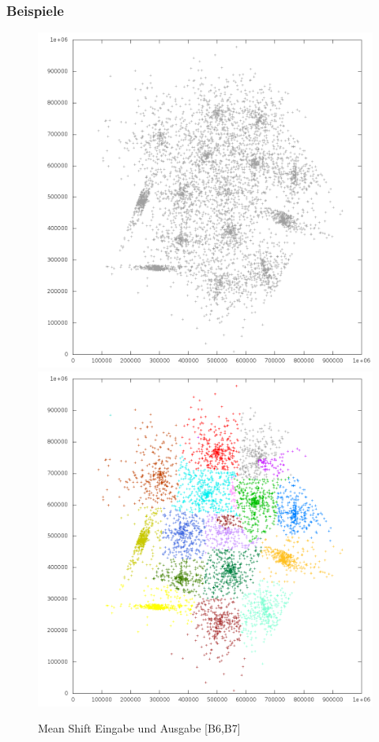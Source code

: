 \documentclass[10pt,utf8]{beamer}
\begin{document}
\begin{frame}
	\frametitle{Beispiele}
	\centering
	\begin{figure}[p!]
		\vspace{-10pt}
		\hspace{-25pt}
		\includegraphics[scale=0.23, keepaspectratio]{../output/pics/s4_black.png}
		\includegraphics[scale=0.23, keepaspectratio]{../output/pics/s4_colored.png}
		\caption{Mean Shift Eingabe und Ausgabe [B6,B7]}
	\end{figure}
\end{frame}
\end{document}
